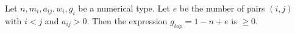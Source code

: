 \begin{lemma}
\label{lemma-top-genus}
Let $n, m_i, a_{ij}, w_i, g_i$ be a numerical type.
Let $e$ be the number of pairs $(i, j)$ with $i < j$ and $a_{ij} > 0$.
Then the expression $g_{top} = 1 - n + e$ is $\geq 0$.
\end{lemma}